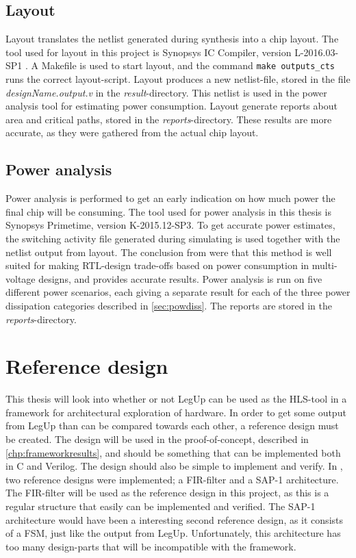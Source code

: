 \subsection{Layout}
Layout translates the netlist generated during synthesis into a chip layout. The tool used for layout in this project is Synopsys IC Compiler, version L-2016.03-SP1 \cite{syniccomp}. A Makefile is used to start layout, and the command \verb!make outputs_cts! runs the correct layout-script. Layout produces a new netlist-file, stored in the file \textit{designName.output.v} in the \textit{result}-directory. This netlist is used in the power analysis tool for estimating power consumption. Layout generate reports about area and critical paths, stored in the \textit{reports}-directory. These results are more accurate, as they were gathered from the actual chip layout.
\subsection{\label{sec:powest}Power analysis}
Power analysis is performed to get an early indication on how much power the final chip will be consuming. The tool used for power analysis in this thesis is Synopsys Primetime, version K-2015.12-SP3. To get accurate power estimates, the switching activity file generated during simulating is used together with the netlist output from layout. The conclusion from \cite{talstad15master} were that this method is well suited for making RTL-design trade-offs based on power consumption in multi-voltage designs, and provides accurate results. Power analysis is run on five different power scenarios, each giving a separate result for each of the three power dissipation categories described in \cref{sec:powdiss}. The reports are stored in the \textit{reports}-directory.

\section{Reference design}
\label{sec:refdes}
This thesis will look into whether or not LegUp can be used as the HLS-tool in a framework for architectural exploration of hardware. In order to get some output from LegUp than can be compared towards each other, a reference design must be created. The design will be used in the proof-of-concept, described in \cref{chp:frameworkresults}, and should be something that can be implemented both in C and Verilog. The design should also be simple to implement and verify. In \cite{holm2015pro}, two reference designs were implemented; a FIR-filter and a SAP-1 architecture. The FIR-filter will be used as the reference design in this project, as this is a regular structure that easily can be implemented and verified. The SAP-1 architecture would have been a interesting second reference design, as it consists of a FSM, just like the output from LegUp. Unfortunately, this architecture has too many design-parts that will be incompatible with the framework.

